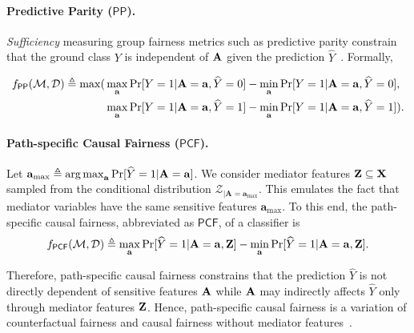 \paragraph{Predictive Parity ($ \mathsf{PP} $).} \textit{Sufficiency} measuring group fairness metrics such as predictive parity constrain that the ground class $ Y $ is independent of $ \mathbf{A} $ given the prediction $ \widehat{Y} $~\cite{verma2018fairness}. Formally, 

\begin{align*}
	f_{\mathsf{PP}}(\mathcal{M}, \mathcal{D})  \triangleq \max(&\max_{\mathbf{a}}\Pr[Y =1 | \mathbf{A} = \mathbf{a}, \widehat{Y} = 0] - \min_{\mathbf{a}}\Pr[Y =1 | \mathbf{A} = \mathbf{a}, \widehat{Y} = 0], \\&\max_{\mathbf{a}}\Pr[Y =1 | \mathbf{A} = \mathbf{a}, \widehat{Y} = 1] - \min_{\mathbf{a}}\Pr[Y =1 | \mathbf{A} = \mathbf{a}, \widehat{Y} = 1]).
\end{align*}

\paragraph{Path-specific Causal Fairness ($ \mathsf{PCF} $).}
Let $ \mathbf{a}_{\max}  \triangleq \operatorname*{arg\,max}_{ \mathbf{a}} \Pr[\widehat{Y} =1 |\mathbf{A}=  \mathbf{a}] $. We consider mediator features $ \mathbf{Z} \subseteq \mathbf{X} $ sampled from the conditional distribution $ {\mathcal{Z}_{|\mathbf{A} = \mathbf{a}_{\max}}} $. This emulates the fact that mediator variables have the same sensitive features $ \mathbf{a}_{\max} $.   To this end, the path-specific causal fairness, abbreviated as $ \mathsf{PCF} $, of a classifier is \[
f_{\mathsf{PCF}}(\mathcal{M}, \mathcal{D}) \triangleq \max_{\mathbf{a}}\Pr[\widehat{Y} = 1 | \mathbf{A} =  \mathbf{a}, \mathbf{Z}] - \min_{\mathbf{a}} \Pr[\widehat{Y} = 1 | \mathbf{A} = \mathbf{a}, \mathbf{Z} ].
\]



Therefore, path-specific causal fairness constrains that the prediction $ \widehat{Y} $ is not directly dependent of sensitive features $ \mathbf{A} $ while $ \mathbf{A} $ may indirectly affects $ \widehat{Y} $ only through mediator features $ \mathbf{Z} $. Hence, path-specific causal fairness is a variation of counterfactual fairness and causal fairness without mediator features~\cite{bastani2019probabilistic}. 




